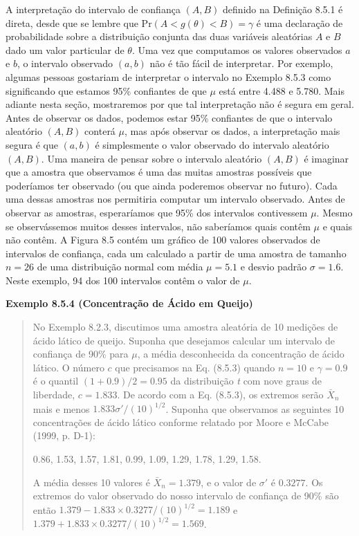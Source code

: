 A interpretação do intervalo de confiança $(A, B)$ definido na Definição 8.5.1 é direta, desde que se lembre que $\text{Pr}(A < g(\theta) < B) = \gamma$ é uma declaração de probabilidade sobre a distribuição conjunta das duas variáveis aleatórias $A$ e $B$ dado um valor particular de $\theta$. Uma vez que computamos os valores observados $a$ e $b$, o intervalo observado $(a, b)$ não é tão fácil de interpretar. Por exemplo, algumas pessoas gostariam de interpretar o intervalo no Exemplo 8.5.3 como significando que estamos 95\% confiantes de que $\mu$ está entre 4.488 e 5.780. Mais adiante nesta seção, mostraremos por que tal interpretação não é segura em geral. Antes de observar os dados, podemos estar 95\% confiantes de que o intervalo aleatório $(A, B)$ conterá $\mu$, mas após observar os dados, a interpretação mais segura é que $(a, b)$ é simplesmente o valor observado do intervalo aleatório $(A, B)$. Uma maneira de pensar sobre o intervalo aleatório $(A, B)$ é imaginar que a amostra que observamos é uma das muitas amostras possíveis que poderíamos ter observado (ou que ainda poderemos observar no futuro). Cada uma dessas amostras nos permitiria computar um intervalo observado. Antes de observar as amostras, esperaríamos que 95\% dos intervalos contivessem $\mu$. Mesmo se observássemos muitos desses intervalos, não saberíamos quais contêm $\mu$ e quais não contêm. A Figura 8.5 contém um gráfico de 100 valores observados de intervalos de confiança, cada um calculado a partir de uma amostra de tamanho $n=26$ de uma distribuição normal com média $\mu=5.1$ e desvio padrão $\sigma=1.6$. Neste exemplo, 94 dos 100 intervalos contêm o valor de $\mu$.

\vspace{1em}
\noindent\textbf{Exemplo 8.5.4 (Concentração de Ácido em Queijo)}
\begin{quote}
    No Exemplo 8.2.3, discutimos uma amostra aleatória de 10 medições de ácido lático de queijo. Suponha que desejamos calcular um intervalo de confiança de 90\% para $\mu$, a média desconhecida da concentração de ácido lático. O número $c$ que precisamos na Eq. (8.5.3) quando $n=10$ e $\gamma=0.9$ é o quantil $(1+0.9)/2 = 0.95$ da distribuição \textit{t} com nove graus de liberdade, $c = 1.833$. De acordo com a Eq. (8.5.3), os extremos serão $\bar{X}_n$ mais e menos $1.833\sigma'/(10)^{1/2}$. Suponha que observamos as seguintes 10 concentrações de ácido lático conforme relatado por Moore e McCabe (1999, p. D-1):
    \begin{center}
        0.86, 1.53, 1.57, 1.81, 0.99, 1.09, 1.29, 1.78, 1.29, 1.58.
    \end{center}
    A média desses 10 valores é $\bar{X}_n = 1.379$, e o valor de $\sigma'$ é $0.3277$. Os extremos do valor observado do nosso intervalo de confiança de 90\% são então $1.379 - 1.833 \times 0.3277/(10)^{1/2} = 1.189$ e $1.379 + 1.833 \times 0.3277/(10)^{1/2} = 1.569$.
\end{quote}
\vspace{1em}

